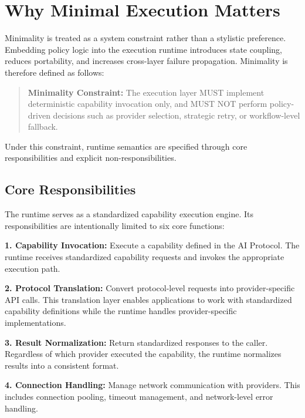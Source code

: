 \section{Why Minimal Execution Matters}

Minimality is treated as a system constraint rather than a stylistic preference. Embedding policy logic into the execution runtime introduces state coupling, reduces portability, and increases cross-layer failure propagation. Minimality is therefore defined as follows:

\begin{quote}
\textbf{Minimality Constraint:} The execution layer MUST implement deterministic capability invocation only, and MUST NOT perform policy-driven decisions such as provider selection, strategic retry, or workflow-level fallback.
\end{quote}

Under this constraint, runtime semantics are specified through core responsibilities and explicit non-responsibilities.

\subsection{Core Responsibilities}

The runtime serves as a standardized capability execution engine. Its responsibilities are intentionally limited to six core functions:

\textbf{1. Capability Invocation:} Execute a capability defined in the AI Protocol. The runtime receives standardized capability requests and invokes the appropriate execution path.

\textbf{2. Protocol Translation:} Convert protocol-level requests into provider-specific API calls. This translation layer enables applications to work with standardized capability definitions while the runtime handles provider-specific implementations.

\textbf{3. Result Normalization:} Return standardized responses to the caller. Regardless of which provider executed the capability, the runtime normalizes results into a consistent format.

\textbf{4. Connection Handling:} Manage network communication with providers. This includes connection pooling, timeout management, and network-level error handling.

